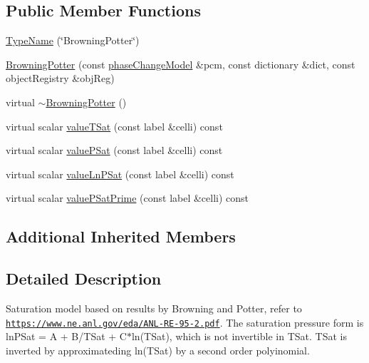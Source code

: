 \subsection*{Public Member Functions}
\begin{DoxyCompactItemize}
\item 
\hyperlink{classFoam_1_1saturationModels_1_1BrowningPotter_a04b6cae5c5e6f7717ccf77536f344cf4}{Type\+Name} (\char`\"{}Browning\+Potter\char`\"{})
\item 
\hyperlink{classFoam_1_1saturationModels_1_1BrowningPotter_aa68c046ff0f8e8b975cc1ae9ce80a78c}{Browning\+Potter} (const \hyperlink{classFoam_1_1phaseChangeModel}{phase\+Change\+Model} \&pcm, const dictionary \&dict, const object\+Registry \&obj\+Reg)
\item 
virtual \hyperlink{classFoam_1_1saturationModels_1_1BrowningPotter_a4e39142331f72b867f1264fad676776b}{$\sim$\+Browning\+Potter} ()
\item 
virtual scalar \hyperlink{classFoam_1_1saturationModels_1_1BrowningPotter_a7d5f6259360b96b89a000c84ef880614}{value\+T\+Sat} (const label \&celli) const
\item 
virtual scalar \hyperlink{classFoam_1_1saturationModels_1_1BrowningPotter_a800a121f3086c2580a025d245a1b8178}{value\+P\+Sat} (const label \&celli) const
\item 
virtual scalar \hyperlink{classFoam_1_1saturationModels_1_1BrowningPotter_ac2c267657ff259967a96210a8fcb3c3f}{value\+Ln\+P\+Sat} (const label \&celli) const
\item 
virtual scalar \hyperlink{classFoam_1_1saturationModels_1_1BrowningPotter_acfe2ee8e32ce482cc86e523e7266bb1f}{value\+P\+Sat\+Prime} (const label \&celli) const
\end{DoxyCompactItemize}
\subsection*{Additional Inherited Members}


\subsection{Detailed Description}
Saturation model based on results by Browning and Potter, refer to \href{https://www.ne.anl.gov/eda/ANL-RE-95-2.pdf}{\tt https\+://www.\+ne.\+anl.\+gov/eda/\+A\+N\+L-\/\+R\+E-\/95-\/2.\+pdf}. The saturation pressure form is ln\+P\+Sat = A + B/\+T\+Sat + C$\ast$ln(T\+Sat), which is not invertible in T\+Sat. T\+Sat is inverted by approximateding ln(\+T\+Sat) by a second order polyinomial. 

